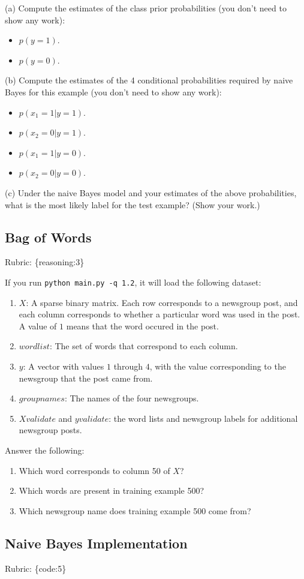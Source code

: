 \documentclass{article}
\def\blu#1{{\color{blu}#1}}
\def\gre#1{{\color{gre}#1}}
\def\items#1{\begin{itemize}#1\end{itemize}}
\def\enum#1{\begin{enumerate}#1\end{enumerate}}
\def\rubric#1{\gre{Rubric: \{#1\}}}{}
\begin{document}
\blu{(a) Compute the estimates of the class prior probabilities} (you don't need to show any work):
\items{
\item$ p(y = 1)$.
\item $p(y = 0)$.
}

\blu{(b) Compute the estimates of the 4 conditional probabilities required by naive Bayes for this example}  (you don't need to show any work):
\items{
\item $p(x_1 = 1 | y = 1)$.
\item $p(x_2 = 0 | y = 1)$.
\item $p(x_1 = 1 | y = 0)$.
\item $p(x_2 = 0 | y = 0)$.
}

\blu{(c) Under the naive Bayes model and your estimates of the above probabilities, what is the most likely label for the test example? (Show your work.)}

\subsection{Bag of Words}
\rubric{reasoning:3}

If you run \texttt{python main.py -q 1.2}, it will load the following dataset:
\enum{
\item $X$: A sparse binary matrix. Each row corresponds to a newsgroup post, and each column corresponds to whether a particular word was used in the post. A value of $1$ means that the word occured in the post.
\item $wordlist$: The set of words that correspond to each column.
\item $y$: A vector with values $1$ through $4$, with the value corresponding to the newsgroup that the post came from.
\item $groupnames$: The names of the four newsgroups.
\item $Xvalidate$ and $yvalidate$: the word lists and newsgroup labels for additional newsgroup posts.
}
\blu{Answer the following}:
\enum{
\item Which word corresponds to column 50 of $X$?
\item Which words are present in training example 500?
\item Which newsgroup name does training example 500 come from?
}

\subsection{Naive Bayes Implementation}
\rubric{code:5}
\end{document}
